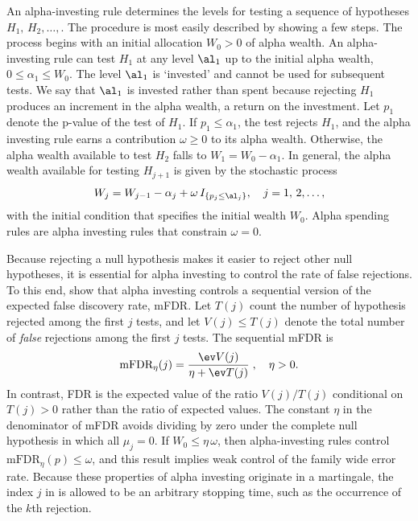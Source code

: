 \documentclass{gSCS2e}
\begin{document}
 An alpha-investing rule \citep{fosterstine08} determines the levels for testing
 a sequence of hypotheses $H_1, \,H_2, \dots,$.  The procedure is most easily described
 by showing a few steps.  The process begins with an initial allocation $W_0 >
 0$ of alpha wealth.    An alpha-investing rule can test $H_1$ at
 any level $\al_1$ up to the initial alpha wealth, $0 \le \alpha_1 \le W_0$.
  The level $\al_1$ is `invested' and cannot be used for subsequent tests.  We
 say that $\al_1$ is invested rather than spent because rejecting $H_1$ produces an 
 increment in the alpha wealth, a return on the investment.  Let $p_1$ denote
 the p-value of the test of $H_1$.  If $p_1 \le \alpha_1$, the test rejects
 $H_1$, and the alpha investing rule earns a contribution $\omega \ge
 0$ to its alpha wealth.  Otherwise, the alpha wealth available to test $H_2$
 falls to $W_1 = W_0 - \alpha_1$.  In general, the alpha wealth available for
 testing $H_{j+1}$ is given by the stochastic process
 \begin{equation}
    W_j = W_{j-1} - \alpha_j + \omega \, I_{\{p_j \le \al_j\}}, 
       \quad j = 1,\,2,\ldots,
 \label{eq:Wj}
 \end{equation}
 with the initial condition that specifies the initial wealth $W_0$.  Alpha
 spending rules are alpha investing rules that constrain $\omega = 0$.


 Because rejecting a null hypothesis makes it easier to reject other null
 hypotheses, it is essential for alpha investing to control the rate of false
 rejections.  To this end, \citet{fosterstine08} show that alpha investing
 controls a sequential version of the expected false discovery rate, mFDR.  Let
 $T(j)$ count the number of hypothesis rejected among the first $j$ tests, and let
 $V(j) \le T(j)$ denote the total number of {\em false} rejections among the
 first $j$ tests.  The sequential mFDR is
 \begin{equation}
    \mbox{mFDR}_\eta(j) = \frac{\ev V(j)}{\eta + \ev T(j)} \;, \quad \eta > 0.
 \label{eq:mFDR}
 \end{equation}
 In contrast, FDR is the expected value of the ratio $V(j)/T(j)$ conditional on
 $T(j)>0$ rather than the ratio of expected values.  The constant $\eta$ in the
 denominator of mFDR avoids dividing by zero under the complete null
 hypothesis in which all $\mu_j = 0$.  If $W_0 \le \eta\,\omega$, then
 alpha-investing rules control $\mbox{mFDR}_\eta(p) \le \omega$, and this result
 implies weak control of the family wide error rate.  Because these properties
 of alpha investing originate in a martingale, the index $j$ in  is
 allowed to be an arbitrary stopping time, such as the occurrence of the $k$th
 rejection.
\end{document}
